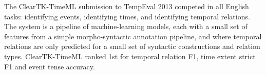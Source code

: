 The ClearTK-TimeML submission to TempEval 2013 competed in all English tasks: identifying events, identifying times, and identifying temporal relations. The
 system is a pipeline of machine-learning models, each with a small set of
 features from a simple morpho-syntactic annotation pipeline, and where temporal
 relations are only predicted for a small set of syntactic constructions and
 relation types. ClearTK-TimeML ranked 1st for temporal relation F1, time extent
 strict F1 and event tense accuracy.

